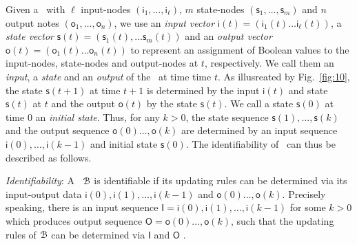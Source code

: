 Given a \BCN\ with $\ell$ input-nodes $(\mathsf{i}_1,\ldots, \mathsf{i}_\ell)$, $m$ state-nodes $(\mathsf{s}_1,\ldots, \mathsf{s}_m)$ and $n$ output notes  $(\mathsf{o}_1,\ldots, \mathsf{o}_n)$,  we use an {\em input vector} $\mathsf{i}(t)=(\mathsf{i}_1(t)\ldots\mathsf{i}_\ell (t))$, a {\em state vector} $\mathsf{s}(t)=(\mathsf{s}_1(t), \ldots \mathsf{s}_m(t))$ and an {\em output  vector} $\mathsf{o}(t)=(\mathsf{o}_1(t) \ldots \mathsf{o}_n(t))$  to represent an assignment of Boolean values to the  input-nodes, state-nodes and  output-nodes at $t$, respectively.  We call them an {\em input}, a {\em state} and an {\em output} of the \BCN\ at time time $t$. As  illusreated by Fig.~\ref{fig:10},  the state $\mathsf{s}(t+1)$ at time $t+1$ is determined by the input   $\mathsf{i}(t)$ and state $\mathsf{s}(t)$ at $t$  and the output   $\mathsf{o}(t)$ by the state  $\mathsf{s}(t)$.  We call a state $\mathsf{s}(0)$ at time $0$ an {\em initial state}. Thus, for any $k>0$, the state sequence  $\mathsf{s}(1),\ldots, \mathsf{s}(k)$ and the output sequence $\mathsf{o}(0)\ldots, \mathsf{o}(k)$ are  determined by an  input sequence $\mathsf{i}(0),\ldots, \mathsf{i}(k-1)$ and initial state $\mathsf{s}(0)$.
%
The identifiability of \BCNs\ can thus be described as follows. 

{\em Identifiability}:
A \BCN\ ${\mathcal{B}}$ is identifiable if its updating rules can be determined via its input-output data $\mathsf{i}(0),\mathsf{i}(1),\ldots, \mathsf{i}(k-1)$ and $\mathsf{o}(0)\ldots, \mathsf{o}(k)$.
Precisely speaking, there is an input sequence $\mathsf{I}=\mathsf{i}(0),\mathsf{i}(1),\ldots, \mathsf{i}(k-1)$ for some $k>0$ which produces output sequence $\mathsf{O}=\mathsf{o}(0)\ldots, \mathsf{o}(k)$, such that the updating rules of ${\mathcal{B}}$ can be determined via $\mathsf{I}$ and $\mathsf{O}$ \cite{Cheng2011Identification}.

